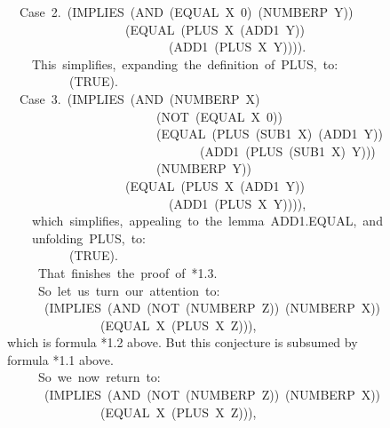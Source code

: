 \documentclass[10pt]{book}
\newenvironment{pubasis}{\begin{flushleft}}{\end{flushleft}}
\begin{document}
\begin{pubasis}
~~Case~2.~(IMPLIES~(AND~(EQUAL~X~0)~(NUMBERP~Y))\\
~~~~~~~~~~~~~~~~~~~(EQUAL~(PLUS~X~(ADD1~Y))\\
~~~~~~~~~~~~~~~~~~~~~~~~~~(ADD1~(PLUS~X~Y)))).\\

~~~~This~simplifies,~expanding~the~definition~of~PLUS,~to:\\

~~~~~~~~~~(TRUE).\\

~~Case~3.~(IMPLIES~(AND~(NUMBERP~X)\\
~~~~~~~~~~~~~~~~~~~~~~~~(NOT~(EQUAL~X~0))\\
~~~~~~~~~~~~~~~~~~~~~~~~(EQUAL~(PLUS~(SUB1~X)~(ADD1~Y))\\
~~~~~~~~~~~~~~~~~~~~~~~~~~~~~~~(ADD1~(PLUS~(SUB1~X)~Y)))\\
~~~~~~~~~~~~~~~~~~~~~~~~(NUMBERP~Y))\\
~~~~~~~~~~~~~~~~~~~(EQUAL~(PLUS~X~(ADD1~Y))\\
~~~~~~~~~~~~~~~~~~~~~~~~~~(ADD1~(PLUS~X~Y)))),\\

~~~~which~simplifies,~appealing~to~the~lemma~ADD1.EQUAL,~and\\
~~~~unfolding~PLUS,~to:\\

~~~~~~~~~~(TRUE).\\

~~~~~That~finishes~the~proof~of~*1.3.\\

~~~~~So~let~us~turn~our~attention~to:\\

~~~~~~(IMPLIES~(AND~(NOT~(NUMBERP~Z))~(NUMBERP~X))\\
~~~~~~~~~~~~~~~(EQUAL~X~(PLUS~X~Z))),\\

which is formula *1.2 above.  But this conjecture is subsumed by\\
formula *1.1 above.\\

~~~~~So~we~now~return~to:\\

~~~~~~(IMPLIES~(AND~(NOT~(NUMBERP~Z))~(NUMBERP~X))\\
~~~~~~~~~~~~~~~(EQUAL~X~(PLUS~X~Z))),\\


\end{pubasis}
\end{document}
